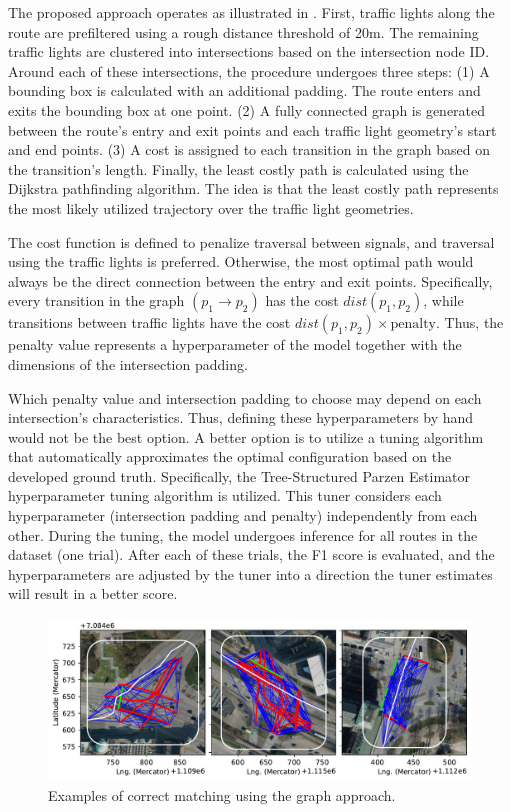 The proposed approach operates as illustrated in . First, traffic lights along the route are prefiltered using a rough distance threshold of 20m. The remaining traffic lights are clustered into intersections based on the intersection node ID. Around each of these intersections, the procedure undergoes three steps: (1) A bounding box is calculated with an additional padding. The route enters and exits the bounding box at one point. (2) A fully connected graph is generated between the route's entry and exit points and each traffic light geometry's start and end points. (3) A cost is assigned to each transition in the graph based on the transition's length. Finally, the least costly path is calculated using the Dijkstra pathfinding algorithm. The idea is that the least costly path represents the most likely utilized trajectory over the traffic light geometries.

The cost function is defined to penalize traversal between signals, and traversal using the traffic lights is preferred. Otherwise, the most optimal path would always be the direct connection between the entry and exit points. Specifically, every transition in the graph  $(p_{1} \rightarrow p_{2})$ has the cost $dist(p_{1}, p_{2})$, while transitions between traffic lights have the cost $dist(p_{1}, p_{2}) \times \text{penalty}$. Thus, the penalty value represents a hyperparameter of the model together with the dimensions of the intersection padding. 

Which penalty value and intersection padding to choose may depend on each intersection's characteristics. Thus, defining these hyperparameters by hand would not be the best option. A better option is to utilize a tuning algorithm that automatically approximates the optimal configuration based on the developed ground truth. Specifically, the Tree-Structured Parzen Estimator hyperparameter tuning algorithm \cite{ozaki_multiobjective_2020} is utilized. This tuner considers each hyperparameter (intersection padding and penalty) independently from each other. During the tuning, the model undergoes inference for all routes in the dataset (one trial). After each of these trials, the F1 score is evaluated, and the hyperparameters are adjusted by the tuner into a direction the tuner estimates will result in a better score.

\begin{figure}[htbp]
\centering
\includegraphics[width=\linewidth]{images/matching-dijkstra-correct.pdf}
\caption{Examples of correct matching using the graph approach.}
\label{fig:sg-selection-graph-example}
\end{figure}

